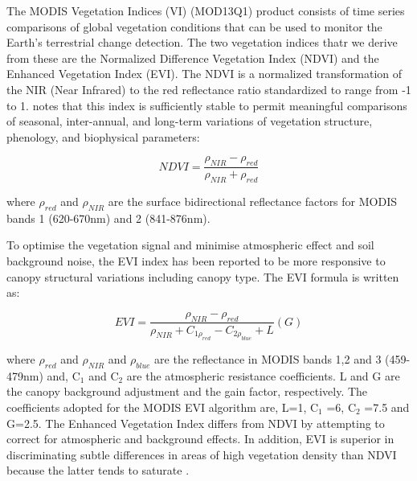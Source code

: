 The MODIS Vegetation Indices (VI) (MOD13Q1) product consists of time series comparisons of global vegetation conditions that can be used to monitor the Earth's terrestrial change detection. The two vegetation indices thatr we derive from these are the Normalized Difference Vegetation Index (NDVI) and the Enhanced Vegetation Index (EVI). The NDVI is a normalized transformation of the NIR (Near Infrared) to the red reflectance ratio standardized to range from -1 to 1.  \citet{ratana_huete_ferreira_2005} notes that this index is sufficiently stable to permit meaningful comparisons of seasonal, inter-annual, and long-term variations of vegetation structure, phenology, and biophysical parameters:


\begin{center}
\begin{equation}
NDVI = \frac{\rho_{NIR} - \rho_{red}}{\rho_{NIR} + \rho_{red}} \label{eq:1.2} 
\end{equation}
\end{center}

where $\rho_{red}$ and $\rho_{NIR}$ are the surface bidirectional reflectance factors for MODIS bands 1 (620-670nm) and 2 (841-876nm). 

To optimise the vegetation signal and minimise atmospheric effect and soil background noise, the EVI index has been reported to be more responsive to canopy structural variations including canopy type. The EVI formula is written as:

\begin{center}
\begin{equation}
EVI = \frac{\rho_{NIR} - \rho_{red}}{\rho_{NIR} + C_{1\rho_{red}} - C_{2\rho_{blue}} + L} (G) \label{eq:2.2} 
\end{equation}
\end{center}

where $\rho_{red}$ and $\rho_{NIR}$ and $\rho_{blue}$ are the reflectance in MODIS bands 1,2 and 3 (459-479nm) and, C$_{1}$ and C$_{2}$ are the atmospheric resistance coefficients. L and G are the canopy background adjustment and the gain factor, respectively. The coefficients adopted for the MODIS EVI algorithm are, L=1, C$_{1}$ =6, C$_{2}$ =7.5 and G=2.5. The Enhanced Vegetation Index differs from NDVI by attempting to correct for atmospheric and background effects. In addition, EVI is superior in discriminating subtle differences in areas of high vegetation density than NDVI because the latter tends to saturate \citep{didan_munoz_2015, ratana_huete_ferreira_2005}.



